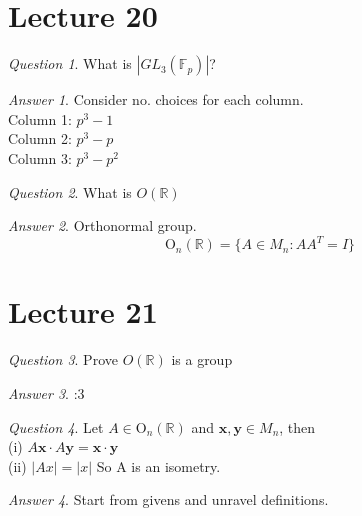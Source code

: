 \documentclass[]{article}
\def\bx{\mathbf x}
\def\by{\mathbf y}
\theoremstyle{remark}
\theoremstyle{qnstyle}
\newtheorem{question}{Question}
\theoremstyle{answerstyle}
\newtheorem*{answer}{Answer}
\begin{document}
\section* {Lecture 20}
{
    \begin{question}
        What is $|GL_3(\mathbb{F}_p)|$?
    \end{question}
    \begin{answer}
        Consider no. choices for each column. \\
        Column 1: $p^3 - 1$ \\
        Column 2: $p^3 - p$\\
        Column 3: $p^3 - p^2$
    \end{answer}
}
{
    \begin{question}
        What is $O(\mathbb{R})$
    \end{question}
    \begin{answer}
        Orthonormal group. $$\text{O}_n(\mathbb{R}) = \{A \in M_n: A A^T = I\}$$
    \end{answer}
}
\section* {Lecture 21}
{
    \begin{question}
        Prove $O(\mathbb{R})$ is a group
    \end{question}
    \begin{answer}
        :3
    \end{answer}
}
{
    \begin{question}
        Let $A \in \text{O}_n(\mathbb{R})$ and $\bx, \by \in M_n$, then \\
        (i) $A\bx \cdot A\by = \bx \cdot \by$\\
        (ii) $|Ax| = |x|$
        So A is an isometry.
    \end{question}
    \begin{answer}
        Start from givens and unravel definitions.
    \end{answer}
}
\end{document}
